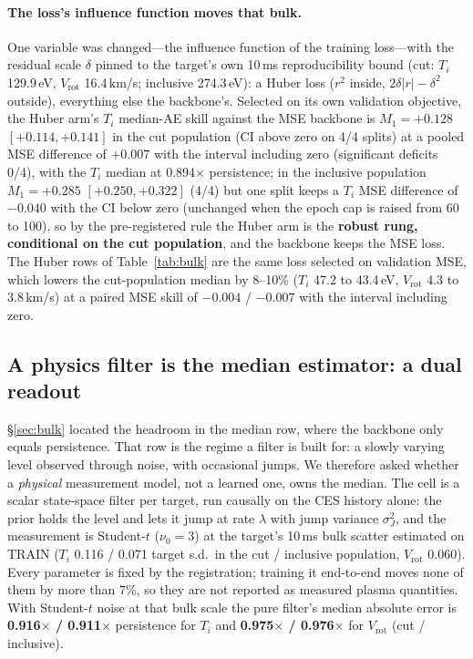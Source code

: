 \documentclass[10pt]{article}
\newcommand{\Ti}{\ensuremath{T_i}}
\newcommand{\Vrot}{\ensuremath{V_\mathrm{rot}}}
\begin{document}
\paragraph{The loss's influence function moves that bulk.} One variable was
changed---the influence function of the training loss---with the residual scale
$\delta$ pinned to the target's own 10\,ms reproducibility bound (cut: \Ti{}
129.9\,eV, \Vrot{} 16.4\,km/s; inclusive 274.3\,eV): a Huber loss ($r^2$ inside,
$2\delta|r|-\delta^2$ outside), everything else the backbone's. Selected on its own
validation objective, the Huber arm's \Ti{} median-AE skill against the MSE backbone
is $M_1 = +0.128$ $[+0.114, +0.141]$ in the cut population (CI above zero on 4/4
splits) at a pooled MSE difference of $+0.007$ with the interval including zero
(significant deficits 0/4), with the \Ti{} median at 0.894$\times$ persistence; in the
inclusive population $M_1 = +0.285$ $[+0.250, +0.322]$ (4/4) but one split keeps a
\Ti{} MSE difference of $-0.040$ with the CI below zero (unchanged when the epoch cap
is raised from 60 to 100), so by the pre-registered rule the Huber arm is the
\textbf{robust rung, conditional on the cut population}, and the backbone keeps the
MSE loss. The Huber rows of Table~\ref{tab:bulk} are the same loss selected on
validation MSE, which lowers the cut-population median by 8--10\% (\Ti{} 47.2 to
43.4\,eV, \Vrot{} 4.3 to 3.8\,km/s) at a paired MSE skill of $-0.004$ / $-0.007$ with
the interval including zero.

\subsection{A physics filter is the median estimator: a dual readout}
\label{sec:physfilter}

\S\ref{sec:bulk} located the headroom in the median row, where the backbone only
equals persistence. That row is the regime a filter is built for: a slowly varying
level observed through noise, with occasional jumps. We therefore asked whether a
\emph{physical} measurement model, not a learned one, owns the median. The cell is a
scalar state-space filter per target, run causally on the CES history alone: the
prior holds the level and lets it jump at rate $\lambda$ with jump variance
$\sigma_J^2$, and the measurement is Student-$t$ ($\nu_0 = 3$) at the target's
10\,ms bulk scatter estimated on TRAIN (\Ti{} 0.116 / 0.071 target s.d.\ in the cut /
inclusive population, \Vrot{} 0.060). Every parameter is fixed by the registration;
training it end-to-end moves none of them by more than 7\%, so they are not reported
as measured plasma quantities.
With Student-$t$ noise at that bulk scale the pure filter's median absolute error is
\textbf{0.916$\times$ / 0.911$\times$} persistence for \Ti{} and
\textbf{0.975$\times$ / 0.976$\times$} for \Vrot{} (cut / inclusive).
\end{document}
